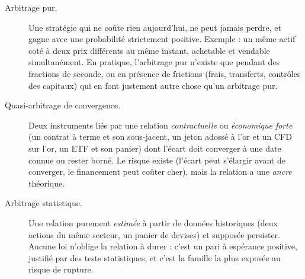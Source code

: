 \begin{description}
\item[Arbitrage pur.] Une stratégie qui ne coûte rien aujourd'hui, ne peut jamais perdre, et gagne avec une probabilité strictement positive. Exemple : un même actif coté à deux prix différents au même instant, achetable et vendable simultanément. En pratique, l'arbitrage pur n'existe que pendant des fractions de seconde, ou en présence de frictions (frais, transferts, contrôles des capitaux) qui en font justement autre chose qu'un arbitrage pur.
\item[Quasi-arbitrage de convergence.] Deux instruments liés par une relation \emph{contractuelle} ou \emph{économique forte} (un contrat à terme et son sous-jacent, un jeton adossé à l'or et un CFD sur l'or, un ETF et son panier) dont l'écart doit converger à une date connue ou rester borné. Le risque existe (l'écart peut s'élargir avant de converger, le financement peut coûter cher), mais la relation a une \emph{ancre} théorique.
\item[Arbitrage statistique.] Une relation purement \emph{estimée} à partir de données historiques (deux actions du même secteur, un panier de devises) et supposée persister. Aucune loi n'oblige la relation à durer : c'est un pari à espérance positive, justifié par des tests statistiques, et c'est la famille la plus exposée au risque de rupture.
\end{description}

